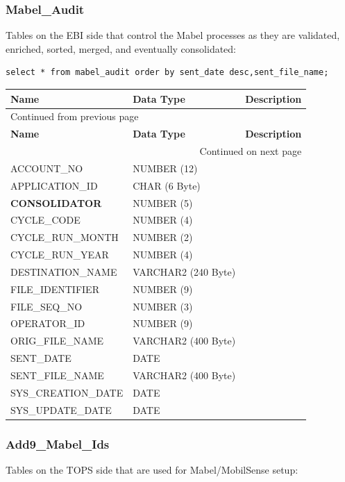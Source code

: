 \documentclass[12pt,twoside]{article}
\begin{document}
\normalsize

\subsubsection{Mabel\_Audit}
\label{sec:orgheadline140}
Tables on the EBI side that control the Mabel processes as they are validated, enriched, sorted, merged, and eventually consolidated:
\begin{verbatim}
select * from mabel_audit order by sent_date desc,sent_file_name;
\end{verbatim}

\footnotesize
\begin{longtable}{l|l|l}
\hline
\textbf{Name} & \textbf{Data Type} & \textbf{Description}\\
\hline
\endfirsthead
\multicolumn{3}{l}{Continued from previous page} \\
\hline

\textbf{Name} & \textbf{Data Type} & \textbf{Description} \\

\hline
\endhead
\hline\multicolumn{3}{r}{Continued on next page} \\
\endfoot
\endlastfoot
\hline
ACCOUNT\_NO & NUMBER (12) & \\
APPLICATION\_ID & CHAR (6 Byte) & \\
\textbf{CONSOLIDATOR} & NUMBER (5) & \\
CYCLE\_CODE & NUMBER (4) & \\
CYCLE\_RUN\_MONTH & NUMBER (2) & \\
CYCLE\_RUN\_YEAR & NUMBER (4) & \\
DESTINATION\_NAME & VARCHAR2 (240 Byte) & \\
FILE\_IDENTIFIER & NUMBER (9) & \\
FILE\_SEQ\_NO & NUMBER (3) & \\
OPERATOR\_ID & NUMBER (9) & \\
ORIG\_FILE\_NAME & VARCHAR2 (400 Byte) & \\
SENT\_DATE & DATE & \\
SENT\_FILE\_NAME & VARCHAR2 (400 Byte) & \\
SYS\_CREATION\_DATE & DATE & \\
SYS\_UPDATE\_DATE & DATE & \\
\hline
\end{longtable}

\normalsize

\subsubsection{Add9\_Mabel\_Ids}
\label{sec:orgheadline141}
Tables on the TOPS side that are used for Mabel/MobilSense setup:
\footnotesize
\end{document}
